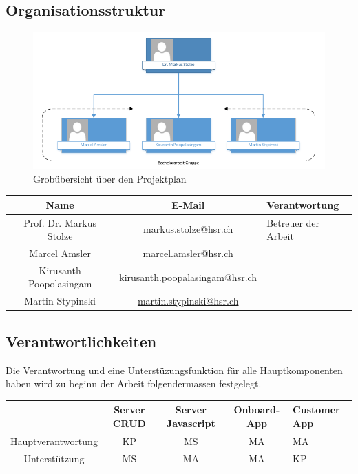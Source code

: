 \subsection{Organisationsstruktur}
\begin{figure}[ht]
	\centering
	\includegraphics[width=\textwidth]{images/organigram.png}
	\caption{Grobübersicht über den Projektplan}
	\label{Risk result}
\end{figure}
\noindent
\begin{tabularx}{\textwidth}{|c|c|X|}
  \hline
  \textbf{Name} & \textbf{E-Mail} & \textbf{Verantwortung} \\
  \hline \hline
  Prof. Dr. Markus Stolze & \url{markus.stolze@hsr.ch} & Betreuer der Arbeit\\
  \hline \hline
  Marcel Amsler & \url{marcel.amsler@hsr.ch} & \\
  \hline
  Kirusanth Poopolasingam & \url{kirusanth.poopalasingam@hsr.ch} & \\
  \hline
  Martin Stypinski & \url{martin.stypinski@hsr.ch} & \\
  \hline
\end{tabularx}
\newpage

\subsection{Verantwortlichkeiten}
Die Verantwortung und eine Unterstüzungsfunktion für alle Hauptkomponenten haben wird zu beginn der Arbeit folgendermassen festgelegt.\\

\begin{tabularx}{\textwidth}{|c|c|c|c|X|}
	\hline
	\textbf{} & \textbf{Server CRUD} & \textbf{Server Javascript} & \textbf{Onboard-App} & \textbf{Customer App} \\
	\hline \hline
	Hauptverantwortung & KP & MS & MA & MA\\
	\hline \hline
	Unterstützung & MS & MA & MA & KP \\
	\hline
\end{tabularx}\\

